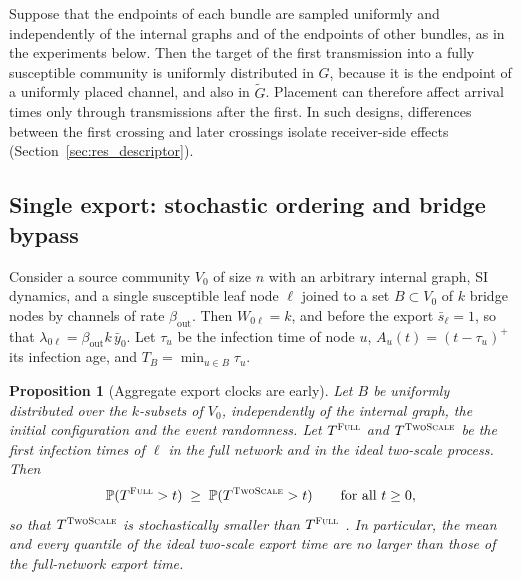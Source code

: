\documentclass[a4paper,fleqn]{cas-sc}
\newtheorem{proposition}{Proposition}
\newcommand{\ibar}{\bar{y}}
\newcommand{\sbar}{\bar{s}}
\newcommand{\Full}{\textup{\textsc{Full}}}
\newcommand{\TS}{\textup{\textsc{TwoScale}}}
\begin{document}
\begin{remark}
\label{rem:placement}
Suppose that the endpoints of each bundle are sampled uniformly and independently of the internal graphs and of the endpoints of other bundles, as in the experiments below. Then the target of the first transmission into a fully susceptible community is uniformly distributed in $G$, because it is the endpoint of a uniformly placed channel, and also in $\tilde G$. Placement can therefore affect arrival times only through transmissions after the first. In such designs, differences between the first crossing and later crossings isolate receiver-side effects (Section~\ref{sec:res_descriptor}).
\end{remark}

\subsection{Single export: stochastic ordering and bridge bypass}
\label{sec:single_export}

Consider a source community $V_0$ of size $n$ with an arbitrary internal graph, SI dynamics, and a single susceptible leaf node $\ell$ joined to a set $B\subset V_0$ of $k$ bridge nodes by channels of rate $\beta_{\mathrm{out}}$. Then $W_{0\ell}=k$, and before the export $\sbar_\ell=1$, so that $\lambda_{0\ell}=\beta_{\mathrm{out}}k\,\ibar_0$. Let $\tau_u$ be the infection time of node $u$, $A_u(t)=(t-\tau_u)^+$ its infection age, and $T_B=\min_{u\in B}\tau_u$.

\begin{proposition}[Aggregate export clocks are early]
\label{prop:ordering}
Let $B$ be uniformly distributed over the $k$-subsets of $V_0$, independently of the internal graph, the initial configuration and the event randomness. Let $T^{\Full}$ and $T^{\TS}$ be the first infection times of $\ell$ in the full network and in the ideal two-scale process. Then
\[
\mathbb{P}(T^{\Full}>t)\;\ge\;\mathbb{P}(T^{\TS}>t)\qquad\text{for all }t\ge0,
\]
so that $T^{\TS}$ is stochastically smaller than $T^{\Full}$ \citep{shaked2007}. In particular, the mean and every quantile of the ideal two-scale export time are no larger than those of the full-network export time.
\end{proposition}
\end{document}
